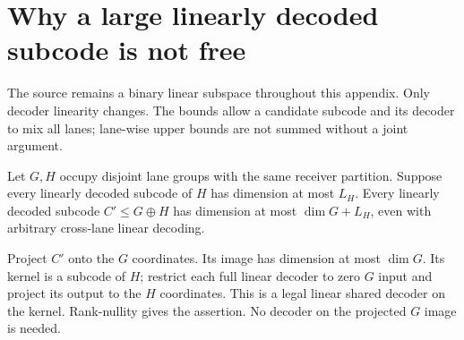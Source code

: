 \section{Why a large linearly decoded subcode is not free}\label{sec:linearization}

The source remains a binary linear subspace throughout this appendix.
Only decoder linearity changes. The bounds allow a candidate subcode
and its decoder to mix all lanes; lane-wise upper bounds are not summed
without a joint argument.

\begin{lemma}\label{lem:lane-projection}
Let $G,H$ occupy disjoint lane groups with the same receiver partition.
Suppose every linearly decoded subcode of $H$ has dimension at most $L_H$.
Every linearly decoded subcode $C'\le G\oplus H$ has dimension at most
$\dim G+L_H$, even with arbitrary cross-lane linear decoding.
\end{lemma}
\begin{outline}
Project $C'$ onto the $G$ coordinates. Its image has dimension at most
$\dim G$. Its kernel is a subcode of $H$; restrict each full linear
decoder to zero $G$ input and project its output to the $H$ coordinates.
This is a legal linear shared decoder on the kernel. Rank-nullity gives
the assertion. No decoder on the projected $G$ image is needed.
\end{outline}


